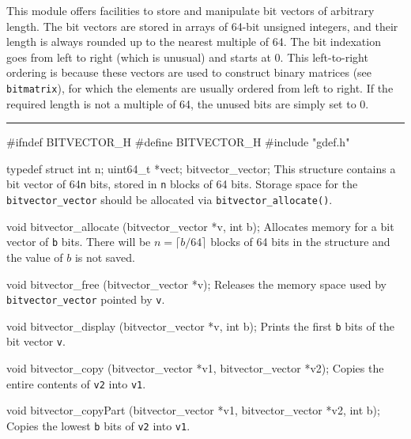 
This module offers facilities to store and manipulate bit vectors of arbitrary length.
The bit vectors are stored in arrays of 64-bit unsigned integers, and their length
is always rounded up to the nearest multiple of 64.
The bit indexation goes from left to right (which is unusual) and starts at 0.
This left-to-right ordering is because these vectors are used to construct
binary matrices (see \texttt{bitmatrix}),
for which the elements are usually ordered from left to right.
If the required length is not a multiple of 64, the unused bits are simply set to 0.


\bigskip\hrule

\code\hide
#ifndef BITVECTOR_H
#define BITVECTOR_H
\endhide
#include "gdef.h"
\endcode
\iffalse %
\code

#define bitvector_WL 64
\endcode
 \tab
Uses 64-bit words.   \pierre{Probably not needed, can be hardcoded to 64.}
 \endtab
\fi  %
\code

typedef struct{
   int n;
   uint64_t *vect;
} bitvector_vector;
\endcode
\tab
This structure contains a bit vector of 64\texttt{n} bits,
stored in {\tt n} blocks of 64 bits.
Storage space for the {\tt bitvector\_vector} should be allocated via
{\tt bitvector\_allocate()}.
\endtab
\code

void bitvector_allocate (bitvector_vector *v, int b);
\endcode
 \tab
Allocates memory for a bit vector of {\tt b} bits.
There will be $n = \lceil b/64 \rceil$ blocks of 64 bits in the structure
and the value of $b$ is not saved.
 \endtab
\code

void bitvector_free (bitvector_vector *v);
\endcode
 \tab
Releases the memory space used by {\tt bitvector\_vector} pointed by {\tt v}.
 \endtab
\code

void bitvector_display (bitvector_vector *v, int b);
\endcode
 \tab
Prints the first {\tt b} bits of the bit vector {\tt v}.
 \endtab
\code

void bitvector_copy (bitvector_vector *v1, bitvector_vector *v2);
  \endcode
 \tab
Copies the entire contents of {\tt v2} into {\tt v1}.
 \endtab
\code

void bitvector_copyPart (bitvector_vector *v1, bitvector_vector *v2, int b);
\endcode
 \tab
Copies the lowest {\tt b} bits of {\tt v2} into {\tt v1}.
 \endtab
\code

